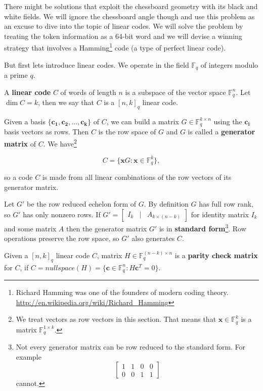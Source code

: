 There might be solutions that exploit the chessboard geometry with its black and white fields. We will ignore the chessboard angle though and use this problem as an excuse to dive into the topic of linear codes. We will solve the problem by treating the token information as a 64-bit word and we will devise a winning strategy that involves a Hamming\footnote{Richard Hamming was one of the founders of modern coding theory. \url{http://en.wikipedia.org/wiki/Richard_Hamming}} code (a type of perfect linear code).

But first lets introduce linear codes. We operate in the field $\mathbb{F}_q$ of integers modulo a prime $q$. 

\begin{defn}\label{linearCodeDef}
A \textbf{linear code} $C$ of words of length $n$ is a subspace of the vector space $\mathbb{F}^n_q$. Let $\dim C = k$, then we say that $C$ is a $[n, k]_q$ linear code.
\end{defn}

Given a basis $\{\bm{c_1}, \bm{c_2}, \ldots, \bm{c_k}\}$ of $C$, we can build a matrix $G \in \mathbb{F}_q^{k \times n}$ using the $\bm{c_i}$ basis vectors as rows. Then $C$ is the row space of $G$ and $G$ is called a \textbf{generator matrix} of $C$. We have\footnote{We treat vectors as row vectors in this section. That means that $\bm{x} \in \mathbb{F}_q^k$ is a matrix $\mathbb{F}_q^{1 \times k}$.}

$$
C = \{\bm{x} G: \bm{x} \in \mathbb{F}_q^k\},
$$

\noindent so a code $C$ is made from all linear combinations of the row vectors of its generator matrix.

Let $G'$ be the row reduced echelon form of $G$. By definition $G$ has full row rank, so $G'$ has only nonzero rows. If 
$
G' = \left[\begin{smallmatrix}
I_k & | & A_{k \times (n - k)}
\end{smallmatrix}\right]
$ 
for identity matrix $I_k$ and some matrix $A$ then the generator matrix $G'$ is in \textbf{standard form}\footnote{Not every generator matrix can be row reduced to the standard form. For example 
$$
\begin{bmatrix}
1 & 1 & 0 & 0 \\
0 & 0 & 1 & 1 
\end{bmatrix}
$$
cannot.}. Row operations preserve the row space, so $G'$ also generates $C$.

\begin{defn}\label{parityCheckDef}
Given a $[n, k]_q$ linear code $C$, matrix $H \in \mathbb{F}_q^{(n-k) \times n}$ is a \textbf{parity check matrix} for $C$, if $C = nullspace(H)=\{\bm{c} \in \mathbb{F}_q^n: H \bm{c}^T = 0\}$.
\end{defn}

